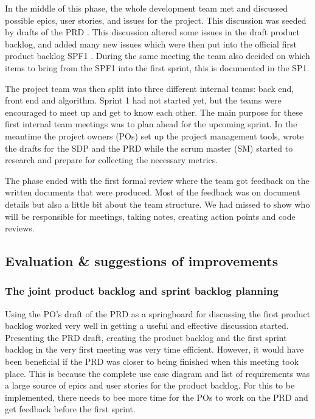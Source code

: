 \documentclass{article}
\begin{document}
In the middle of this phase, the whole development team met and discussed possible epics, user stories, and issues for the project. This discussion was seeded by drafts of the PRD \cite{PRD}. This discussion altered some issues in the draft product backlog, and added many new issues which were then put into the official first product backlog SPF1 \cite{SPF1}. During the same meeting the team also decided on which items to bring from the SPF1 into the first sprint, this is documented in the SP1\cite{SP1}. 

The project team was then split into three different internal teams: back end, front end and algorithm. Sprint 1 had not started yet, but the teams were encouraged to meet up and get to know each other. The main purpose for these first internal team meetings was to plan ahead for the upcoming sprint. In the meantime the project owners (POs) set up the project management tools, wrote the drafts for the SDP and the PRD while the scrum master (SM) started to research and prepare for collecting the necessary metrics.

The phase ended with the first formal review where the team got feedback on the written documents that were produced. Most of the feedback was on document details but also a little bit about the team structure. We had missed to show who will be responsible for meetings, taking notes, creating action points and code reviews.

\subsection{Evaluation \& suggestions of improvements }

\subsubsection{The joint product backlog and sprint backlog planning}
Using the PO's draft of the PRD as a springboard for discussing the first product backlog worked very well in getting a useful and effective discussion started. Presenting the PRD draft, creating the product backlog and the first sprint backlog in the very first meeting was very time efficient. However, it would have been beneficial if the PRD was closer to being finished when this meeting took place. This is because the complete use case diagram and list of requirements was a large source of epics and user stories for the product backlog. For this to be implemented, there needs to bee more time for the POs to work on the PRD and get feedback before the first sprint.
\end{document}
